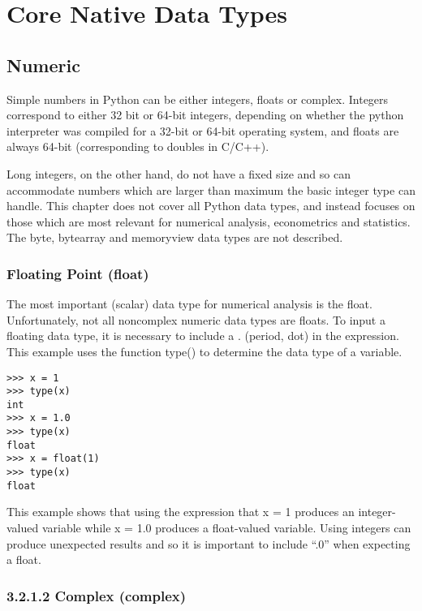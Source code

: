 \documentclass[11pt]{article} %
\begin{document}
\newpage

\section{Core Native Data Types}
\subsection{ Numeric}
Simple numbers in Python can be either integers, floats or complex. Integers correspond to either 32
bit or 64-bit integers, depending on whether the python interpreter was compiled for a 32-bit or 64-bit
operating system, and floats are always 64-bit (corresponding to doubles in C/C++). 

Long integers, on the
other hand, do not have a fixed size and so can accommodate numbers which are larger than maximum
the basic integer type can handle. This chapter does not cover all Python data types, and instead focuses
on those which are most relevant for numerical analysis, econometrics and statistics. The byte, bytearray
and memoryview data types are not described.

\subsubsection{Floating Point (float)}
The most important (scalar) data type for numerical analysis is the float. Unfortunately, not all noncomplex
numeric data types are floats. To input a floating data type, it is necessary to include a . (period,
dot) in the expression. This example uses the function type() to determine the data type of a variable.
\begin{framed}
\begin{verbatim}
>>> x = 1
>>> type(x)
int
>>> x = 1.0
>>> type(x)
float
>>> x = float(1)
>>> type(x)
float
\end{verbatim}
\end{framed}
This example shows that using the expression that x = 1 produces an integer-valued variable while x = 1.0
produces a float-valued variable. Using integers can produce unexpected results and so it is important to
include “.0” when expecting a float.
\subsubsection{3.2.1.2 Complex (complex)}
\end{document}
